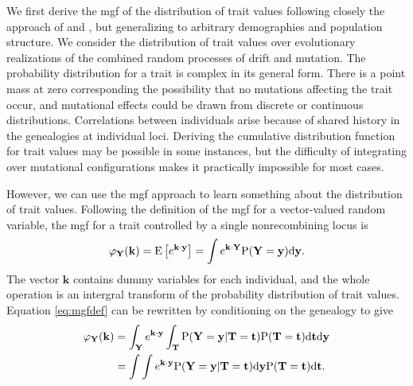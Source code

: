We first derive the mgf of the distribution of trait values following closely
the approach of \citet{Schraiber2015} and \citet{Khaitovich2005}, but
generalizing to arbitrary demographies and population structure. We consider the
distribution of trait values over evolutionary realizations of the combined
random processes of drift and mutation. The probability distribution for a trait
is complex in its general form. There is a point mass at zero corresponding the
possibility that no mutations affecting the trait occur, and mutational effects
could be drawn from discrete or continuous distributions. Correlations between
individuals arise because of shared history in the genealogies at individual
loci. Deriving the cumulative distribution function for trait values may be
possible in some instances, but the difficulty of integrating over mutational
configurations makes it practically impossible for most cases.

However, we can use the mgf approach to learn something about the distribution
of trait values. Following the definition of the mgf for a vector-valued random
variable, the mgf for a trait controlled by a single nonrecombining locus
is \citep{Ross}
\begin{equation}
  \label{eq:mgfdef}
  \varphi_{\mathbf{Y}}(\mathbf{k}) = \mathrm{E}\left[ e^{\mathbf{k} \cdot \mathbf{y}} \right] =
  \int e^{\mathbf{k} \cdot \mathbf{Y}} \mathrm{P}(\mathbf{Y}=\mathbf{y}) \mbox{d}\mathbf{y}.
\end{equation}
The vector $\mathbf{k}$ contains dummy variables for each individual, and the
whole operation is an intergral transform of the probability distribution of
trait values. Equation \eqref{eq:mgfdef} can be rewritten by conditioning on the
genealogy to give
\begin{align}
  \label{eq:cond}
  \varphi_{\mathbf{Y}}(\mathbf{k}) &= \int_{\mathbf{Y}} e^{\mathbf{k} \cdot \mathbf{y}}
  \int_{\mathbf{T}} \mathrm{P}(\mathbf{Y}=\mathbf{y} | \mathbf{T}=\mathbf{t}) \mathrm{P}(\mathbf{T}=\mathbf{t})
  \mbox{d}\mathbf{t} \mbox{d}\mathbf{y} \nonumber \\
  &= \int \int e^{\mathbf{k} \cdot \mathbf{y}} \mathrm{P}(\mathbf{Y}=\mathbf{y} | \mathbf{T}=\mathbf{t}) \mbox{d}\mathbf{y}
  \mathrm{P}(\mathbf{T}=\mathbf{t})
  \mbox{d}\mathbf{t}.
\end{align}

